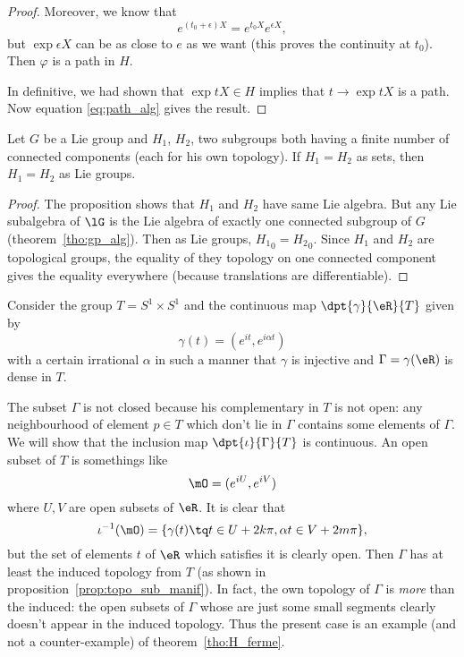\begin{proof}
	Moreover, we know that
	\[
		e^{(t_0+\epsilon)X}=e^{t_0X}e^{\epsilon X},
	\]
	but $\exp \epsilon X$ can be as close to $e$ as we want (this proves the continuity at $t_0$). Then $\varphi$ is a path in $H$.

	In definitive, we had shown that $\exp tX\in H$ implies that $t\to\exp tX$ is a path. Now equation \eqref{eq:path_alg} gives the result.
\end{proof}

\begin{corollary}
	Let $G$ be a Lie group and $H_1$, $H_2$, two subgroups both having a finite number of connected components (each for his own topology). If $H_1=H_2$ as sets, then $H_1=H_2$ as Lie groups.
\end{corollary}

\begin{proof}
	The proposition shows that $H_1$ and $H_2$ have same Lie algebra. But any Lie subalgebra of $\lG$ is the Lie algebra of exactly one connected subgroup of $G$ (theorem~\ref{tho:gp_alg}). Then as Lie groups, ${H_1}_0={H_2}_0$. Since $H_1$ and $H_2$ are topological groups, the equality of they topology on one connected component gives the equality everywhere (because translations are differentiable).
\end{proof}

\label{pg:ex_topo_Lie}
Consider the group $T=S^1\times S^1$ and the continuous map $\dpt{\gamma}{\eR}{T}$ given by
\[
	\gamma(t)=(e^{it},e^{i\alpha t})
\]
with a certain irrational $\alpha$ in such a manner that $\gamma$ is injective and $\Gamma=\gamma(\eR)$ is dense in $T$.

The subset $\Gamma$ is not closed because his complementary in $T$ is not open: any neighbourhood of element $p\in T$ which don't lie in $\Gamma$ contains some elements of $\Gamma$. We will show that the inclusion map $\dpt{\iota}{\Gamma}{T}$ is continuous. An open subset of $T$ is somethings like
\[
	\mO=(e^{iU},e^{iV})
\]
where $U,V$ are open subsets of $\eR$. It is clear that
\[
	\iota^{-1}(\mO)=\{ \gamma(t)\tq t\in U+2k\pi,\alpha t\in V+2m\pi \},
\]
but the set of elements $t$ of $\eR$ which satisfies it is clearly open. Then $\Gamma$ has at least the induced topology from $T$ (as shown in proposition~\ref{prop:topo_sub_manif}). In fact, the own topology of $\Gamma$ is \emph{more} than the induced: the open subsets of $\Gamma$ whose are just some small segments clearly doesn't appear in the induced topology. Thus the present case is an example (and not a counter-example) of theorem~\ref{tho:H_ferme}.

